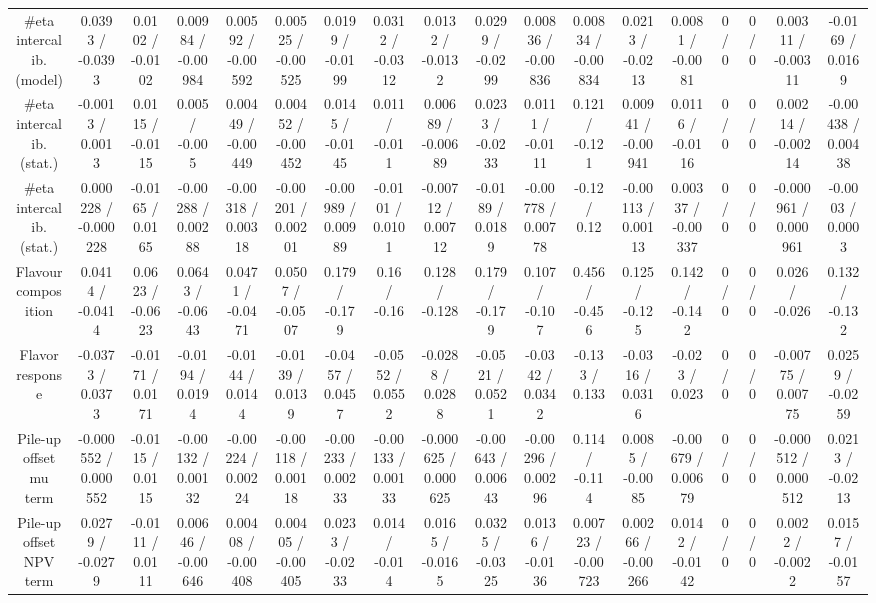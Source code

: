 \documentclass[10pt]{article}
\begin{document}
\begin{table}[htbp]
\begin{center}
\begin{tabular}{|c|c|c|c|c|c|c|c|c|c|c|c|c|c|c|c|c|c|}
  #eta intercalib. (model) & 0.0393 / -0.0393 & 0.0102 / -0.0102 & 0.00984 / -0.00984 & 0.00592 / -0.00592 & 0.00525 / -0.00525 & 0.0199 / -0.0199 & 0.0312 / -0.0312 & 0.0132 / -0.0132 & 0.0299 / -0.0299 & 0.00836 / -0.00836 & 0.00834 / -0.00834 & 0.0213 / -0.0213 & 0.0081 / -0.0081 & 0 / 0 & 0 / 0 & 0.00311 / -0.00311 & -0.0169 / 0.0169 \\ 
  #eta intercalib. (stat.) & -0.0013 / 0.0013 & 0.0115 / -0.0115 & 0.005 / -0.005 & 0.00449 / -0.00449 & 0.00452 / -0.00452 & 0.0145 / -0.0145 & 0.011 / -0.011 & 0.00689 / -0.00689 & 0.0233 / -0.0233 & 0.0111 / -0.0111 & 0.121 / -0.121 & 0.00941 / -0.00941 & 0.0116 / -0.0116 & 0 / 0 & 0 / 0 & 0.00214 / -0.00214 & -0.00438 / 0.00438 \\ 
  #eta intercalib. (stat.) & 0.000228 / -0.000228 & -0.0165 / 0.0165 & -0.00288 / 0.00288 & -0.00318 / 0.00318 & -0.00201 / 0.00201 & -0.00989 / 0.00989 & -0.0101 / 0.0101 & -0.00712 / 0.00712 & -0.0189 / 0.0189 & -0.00778 / 0.00778 & -0.12 / 0.12 & -0.00113 / 0.00113 & 0.00337 / -0.00337 & 0 / 0 & 0 / 0 & -0.000961 / 0.000961 & -0.0003 / 0.0003 \\ 
  Flavour composition & 0.0414 / -0.0414 & 0.0623 / -0.0623 & 0.0643 / -0.0643 & 0.0471 / -0.0471 & 0.0507 / -0.0507 & 0.179 / -0.179 & 0.16 / -0.16 & 0.128 / -0.128 & 0.179 / -0.179 & 0.107 / -0.107 & 0.456 / -0.456 & 0.125 / -0.125 & 0.142 / -0.142 & 0 / 0 & 0 / 0 & 0.026 / -0.026 & 0.132 / -0.132 \\ 
  Flavor response & -0.0373 / 0.0373 & -0.0171 / 0.0171 & -0.0194 / 0.0194 & -0.0144 / 0.0144 & -0.0139 / 0.0139 & -0.0457 / 0.0457 & -0.0552 / 0.0552 & -0.0288 / 0.0288 & -0.0521 / 0.0521 & -0.0342 / 0.0342 & -0.133 / 0.133 & -0.0316 / 0.0316 & -0.023 / 0.023 & 0 / 0 & 0 / 0 & -0.00775 / 0.00775 & 0.0259 / -0.0259 \\ 
  Pile-up offset mu term & -0.000552 / 0.000552 & -0.0115 / 0.0115 & -0.00132 / 0.00132 & -0.00224 / 0.00224 & -0.00118 / 0.00118 & -0.00233 / 0.00233 & -0.00133 / 0.00133 & -0.000625 / 0.000625 & -0.00643 / 0.00643 & -0.00296 / 0.00296 & 0.114 / -0.114 & 0.0085 / -0.0085 & -0.00679 / 0.00679 & 0 / 0 & 0 / 0 & -0.000512 / 0.000512 & 0.0213 / -0.0213 \\ 
  Pile-up offset NPV term & 0.0279 / -0.0279 & -0.0111 / 0.0111 & 0.00646 / -0.00646 & 0.00408 / -0.00408 & 0.00405 / -0.00405 & 0.0233 / -0.0233 & 0.014 / -0.014 & 0.0165 / -0.0165 & 0.0325 / -0.0325 & 0.0136 / -0.0136 & 0.00723 / -0.00723 & 0.00266 / -0.00266 & 0.0142 / -0.0142 & 0 / 0 & 0 / 0 & 0.0022 / -0.0022 & 0.0157 / -0.0157 \\ 

\end{tabular}
\end{center}
\end{table}
\end{document}
